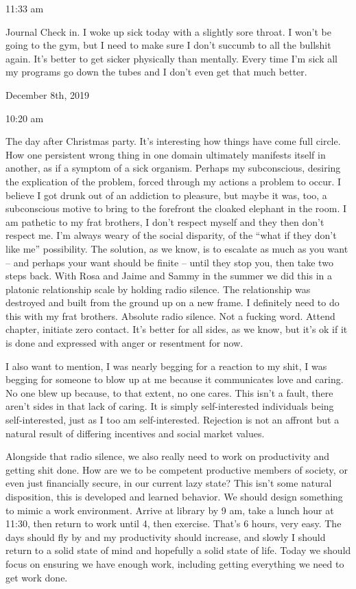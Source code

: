 11:33 am

Journal Check in. I woke up sick today with a slightly sore throat. I
won't be going to the gym, but I need to make sure I don't succumb to
all the bullshit again. It's better to get sicker physically than
mentally. Every time I'm sick all my programs go down the tubes and I
don't even get that much better.

\bigskip
\bigskip
December 8th, 2019

10:20 am

The day after Christmas party. It's interesting how things have come
full circle. How one persistent wrong thing in one domain ultimately
manifests itself in another, as if a symptom of a sick organism. Perhaps
my subconscious, desiring the explication of the problem, forced through
my actions a problem to occur. I believe I got drunk out of an addiction
to pleasure, but maybe it was, too, a subconscious motive to bring to
the forefront the cloaked elephant in the room. I am pathetic to my frat
brothers, I don't respect myself and they then don't respect me. I'm
always weary of the social disparity, of the ``what if they don't like
me'' possibility. The solution, as we know, is to escalate as much as
you want -- and perhaps your want should be finite -- until they stop
you, then take two steps back. With Rosa and Jaime and Sammy in the
summer we did this in a platonic relationship scale by holding radio
silence. The relationship was destroyed and built from the ground up on
a new frame. I definitely need to do this with my frat brothers.
Absolute radio silence. Not a fucking word. Attend chapter, initiate
zero contact. It's better for all sides, as we know, but it's ok if it
is done and expressed with anger or resentment for now.

I also want to mention, I was nearly begging for a reaction to my shit,
I was begging for someone to blow up at me because it communicates love
and caring. No one blew up because, to that extent, no one cares. This
isn't a fault, there aren't sides in that lack of caring. It is simply
self-interested individuals being self-interested, just as I too am
self-interested. Rejection is not an affront but a natural result of
differing incentives and social market values.

Alongside that radio silence, we also really need to work on
productivity and getting shit done. How are we to be competent
productive members of society, or even just financially secure, in our
current lazy state? This isn't some natural disposition, this is
developed and learned behavior. We should design something to mimic a
work environment. Arrive at library by 9 am, take a lunch hour at 11:30,
then return to work until 4, then exercise. That's 6 hours, very easy.
The days should fly by and my productivity should increase, and slowly I
should return to a solid state of mind and hopefully a solid state of
life. Today we should focus on ensuring we have enough work, including
getting everything we need to get work done.

